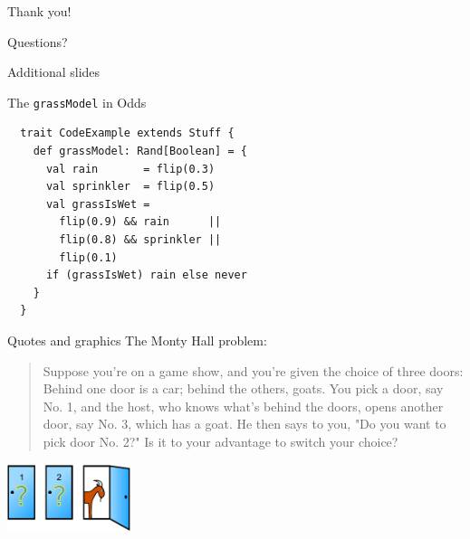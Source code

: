 \documentclass[xcolor={usenames,dvipsnames}]{beamer}
\renewcommand{\emph}[1]{\alert{#1}}
\begin{document}
\begin{frame}{Thank you!}
  \begin{center}
    \Huge Questions?
  \end{center}
\end{frame}


\appendix
{}
\setcounter{finalframe}{\value{framenumber}}

\begin{frame}[noframenumbering]
  \begin{center}
    \emph{\LARGE Additional slides}
  \end{center}
\end{frame}

\begin{frame}[fragile]{The \texttt{grassModel} in Odds}
  \setcounter{framenumber}{\value{finalframe}}%
  \begin{lstlisting}
  trait CodeExample extends Stuff {
    def grassModel: Rand[Boolean] = {
      val rain       = flip(0.3)
      val sprinkler  = flip(0.5)
      val grassIsWet =
        flip(0.9) && rain      ||
        flip(0.8) && sprinkler ||
        flip(0.1)
      if (grassIsWet) rain else never
    }
  }
  \end{lstlisting}
\end{frame}

\begin{frame}[noframenumbering]{Quotes and graphics}
  The Monty Hall problem:
  \begin{quote}
    Suppose you're on a game show, and you're given the choice of
    three doors: Behind one door is a car; behind the others,
    goats. You pick a door, say No. 1, and the host, who knows what's
    behind the doors, opens another door, say No. 3, which has a
    goat. He then says to you, "Do you want to pick door No. 2?" Is it
    to your advantage to switch your choice?

    \hfill{\em \cite{vosSavant1990monty}}
  \end{quote}
  \begin{center}
    \includegraphics[height=2cm]{img/monty/Monty_open_door}
  \end{center}
\end{frame}





\end{document}
